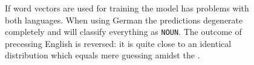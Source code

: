 \begin{figure}
{		}
	\caption{If word vectors are used for training the model has problems with both languages. When using German the predictions degenerate completely and will classify everything as \texttt{NOUN}. The outcome of precessing English is reversed: it is quite close to an identical distribution which equals mere guessing amidst the .}
	\label{fig: avg model gt w2v de en}
\end{figure}

